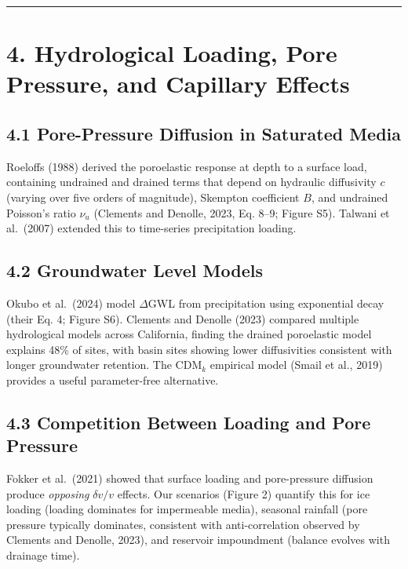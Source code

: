 \documentclass[draft]{agujournal2019}
\begin{document}
\begin{center}\rule{0.5\linewidth}{0.5pt}\end{center}

\section{4. Hydrological Loading, Pore Pressure, and Capillary
Effects}\label{hydrological-loading-pore-pressure-and-capillary-effects}

\subsection{4.1 Pore-Pressure Diffusion in Saturated
Media}\label{pore-pressure-diffusion-in-saturated-media}

Roeloffs (1988) derived the poroelastic response at depth to a surface
load, containing undrained and drained terms that depend on hydraulic
diffusivity \(c\) (varying over five orders of magnitude), Skempton
coefficient \(B\), and undrained Poisson's ratio \(\nu_u\) (Clements and
Denolle, 2023, Eq. 8--9; Figure S5). Talwani et al.~(2007) extended this
to time-series precipitation loading.

\subsection{4.2 Groundwater Level
Models}\label{groundwater-level-models}

Okubo et al.~(2024) model \(\Delta\)GWL from precipitation using
exponential decay (their Eq. 4; Figure S6). Clements and Denolle (2023)
compared multiple hydrological models across California, finding the
drained poroelastic model explains 48\% of sites, with basin sites
showing lower diffusivities consistent with longer groundwater
retention. The CDM\(_k\) empirical model (Smail et al., 2019) provides a
useful parameter-free alternative.

\subsection{4.3 Competition Between Loading and Pore
Pressure}\label{competition-between-loading-and-pore-pressure}

Fokker et al.~(2021) showed that surface loading and pore-pressure
diffusion produce \emph{opposing} \(\delta v/v\) effects. Our scenarios
(Figure 2) quantify this for ice loading (loading dominates for
impermeable media), seasonal rainfall (pore pressure typically
dominates, consistent with anti-correlation observed by Clements and
Denolle, 2023), and reservoir impoundment (balance evolves with drainage
time).
\end{document}
